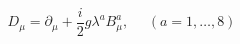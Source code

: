 \begin{equation}
D_{\mu} =\partial_{\mu} + \frac{i}{2} g \lambda^{a}
B_{\mu}^{a} ,~~~~~~ (a = 1, \ldots, 8)  
\end{equation}

